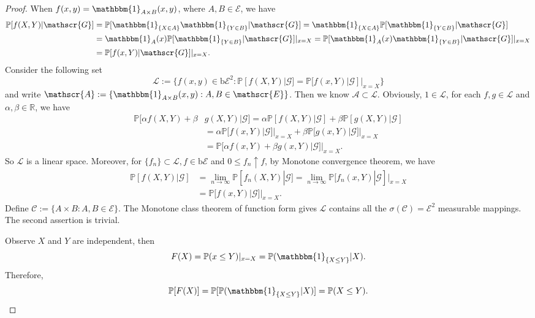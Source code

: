 \documentclass[12pt]{article}
\renewcommand{\(}{\left(}%
\renewcommand{\)}{\right)}%
\renewcommand{\[}{\left[}%
\renewcommand{\]}{\right]}%
\renewcommand{\r}{\mathbb{R}}
\renewcommand{\a}{\mathscr{A}}
\renewcommand{\l}{\mathscr{L}}
\newcommand{\p}{\mathbb{P}}
\newcommand{\e}{\mathscr{E}}
\newcommand{\g}{\mathscr{G}}
\newtheorem{proof}{Proof.}}
\begin{document}
  \begin{proof}
   When $f(x,y)=\mathbbm{1}_{A\times B}(x,y)$, where $A,B\in\e$, we have
   \begin{equation*}
    \begin{split}
     \p[f(X,Y)|\g]&=\p[\mathbbm{1}_{\{X\in A\}}\mathbbm{1}_{\{Y\in B\}}|\g]=\mathbbm{1}_{\{X\in A\}}\p[\mathbbm{1}_{\{Y\in B\}}|\g]\\
     &=\mathbbm{1}_{A}(x)\p[\mathbbm{1}_{\{Y\in B\}}|\g]|_{x=X}=\p[\mathbbm{1}_{A}(x)\mathbbm{1}_{\{Y\in B\}}|\g]|_{x=X}\\
     &=\p[f(x,Y)|\g]|_{x=X}.
    \end{split}
   \end{equation*}
   Consider the following set
   \begin{equation*}
    \l:=\{f(x,y)\in\mathrm{b}\e^2:\p[f(X,Y)|\g]=\p[f(x,Y)|\g]|_{x=X} \}
   \end{equation*}
   and write $\a:=\{\mathbbm{1}_{A\times B}(x,y):A,B\in\e\}$. Then we know $\a\subset\l$. Obviously, $1\in \l$, for each $f,g\in\l$ and $\alpha,\beta\in\r $, we have
   \begin{equation*}
    \begin{split}
     \p[\alpha f(X,Y)+\beta &g(X,Y)|\g]=\alpha \p[ f(X,Y)|\g]+\beta \p[g(X,Y)|\g]\\
     &=\alpha \p[f(x,Y)|\g]|_{x=X}+\beta \p[g(x,Y)|\g]|_{x=X}\\
     &=\p[\alpha f(x,Y)+\beta g(x,Y)|\g]|_{x=X}.
    \end{split}
   \end{equation*}
   So $\l$ is a linear space. Moreover, for $\{f_n\}\subset\l,f\in\mathrm{b}\e$ and $0\leq f_n\uparrow f$, by {\sffamily Monotone convergence theorem}, we have
   \begin{equation*}
    \begin{split}
     \p[f(X,Y)|\g]&=\lim_{n\to\infty}\p[f_n(X,Y)|\g]=\lim_{n\to\infty}\p[f_n(x,Y)|\g]|_{x=X}\\
     &=\p[f(x,Y)|\g]|_{x=X}.
    \end{split}
   \end{equation*}
   Define $\mathscr{C}:=\{A\times B:A,B\in\e\}$.  The {\sffamily Monotone class theorem of function form} gives $\l$ contains all the $\sigma(\mathscr{C})=\e^2$ measurable mappings. The second assertion is trivial.

   Observe $X$ and $Y$ are independent, then
   \begin{equation*}
    F(X)=\p(x\leq Y)|_{x=X}=\p(\mathbbm{1}_{\{X\leq Y\}}|X).
   \end{equation*}
   Therefore,
   \begin{equation*}
    \p[F(X)]=\p[\p(\mathbbm{1}_{\{X\leq Y\}}|X)]=\p(X\leq Y).
   \end{equation*}
  \end{proof}
\end{document}
